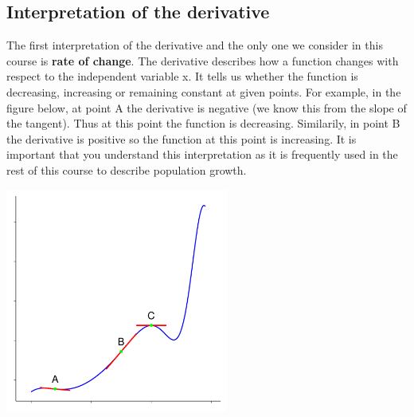 \documentclass[a4paper]{report}
\begin{document}
\subsection{Interpretation of the derivative}
The first interpretation of the derivative and the only one we consider in this course is \textbf{rate of change}. The derivative describes how a function changes with respect to the independent variable x. It tells us whether the function is decreasing, increasing or remaining constant at given points. For example, in the figure below, at point A the derivative is negative (we know this from the slope of the tangent). Thus at this point the function is decreasing. Similarily, in point B the derivative is positive so the function at this point is increasing. It is important that you understand this interpretation as it is frequently used in the rest of this course to describe population growth.
\begin{center}
\includegraphics[width=0.55\textwidth]{der_graph2.pdf}
\end{center}
\end{document}
